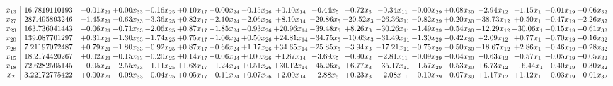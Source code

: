 \documentclass[9pt]{article}
\begin{document}
 \[\begin{array}{c| c c@{\hskip 2pt} c@{\hskip 2pt} c@{\hskip 2pt} c@{\hskip 2pt} c@{\hskip 2pt} c@{\hskip 2pt} c@{\hskip 2pt} c@{\hskip 2pt} c@{\hskip 2pt} c@{\hskip 2pt} c@{\hskip 2pt} c@{\hskip 2pt} c@{\hskip 2pt} c@{\hskip 2pt} c@{\hskip 2pt} c@{\hskip 2pt} }
 x_{13}   &  16.7819110193 & -0.01 x_{21} & +  0.00 x_{33} & -0.16 x_{25} & +  0.10 x_{17} & -0.00 x_{24} & -0.15 x_{26} & +  0.10 x_{14} & -0.44 x_{5} & -0.72 x_{3} & -0.34 x_{11} & -0.00 x_{29} & +  0.08 x_{30} & -2.94 x_{12} & -1.15 x_{1} & -0.01 x_{19} & +  0.06 x_{32}\\
 x_{27}   &  287.495893246 & -1.45 x_{21} & -0.63 x_{33} & -3.36 x_{25} & +  0.82 x_{17} & -2.10 x_{24} & -2.06 x_{26} & +  8.10 x_{14} & -29.86 x_{5} & -20.52 x_{3} & -26.36 x_{11} & -0.82 x_{29} & +  0.20 x_{30} & -38.73 x_{12} & +  0.50 x_{1} & -0.47 x_{19} & +  2.26 x_{32}\\
 x_{23}   &  163.736041443 & -0.06 x_{21} & -0.71 x_{33} & -2.06 x_{25} & +  0.87 x_{17} & -1.85 x_{24} & -0.93 x_{26} & + 20.96 x_{14} & -39.48 x_{5} & +  8.26 x_{3} & -30.26 x_{11} & -1.49 x_{29} & -0.54 x_{30} & -12.29 x_{12} & + 30.06 x_{1} & -0.15 x_{19} & +  0.61 x_{32}\\
 x_{20}   &  139.087701297 & +  0.31 x_{21} & -1.30 x_{33} & -1.74 x_{25} & +  0.75 x_{17} & -1.06 x_{24} & +  0.50 x_{26} & + 24.81 x_{14} & -34.75 x_{5} & -10.63 x_{3} & -31.49 x_{11} & -1.30 x_{29} & -0.42 x_{30} & +  2.09 x_{12} & +  0.77 x_{1} & -0.70 x_{19} & +  0.16 x_{32}\\
 x_{28}   &  7.21197072487 & +  0.79 x_{21} & -1.80 x_{33} & -0.92 x_{25} & +  0.87 x_{17} & -0.66 x_{24} & +  1.17 x_{26} & + 34.65 x_{14} & -25.85 x_{5} & -3.94 x_{3} & -17.21 x_{11} & -0.75 x_{29} & -0.50 x_{30} & + 18.67 x_{12} & +  2.86 x_{1} & -0.46 x_{19} & -0.28 x_{32}\\
 x_{15}   &  18.2174420267 & +  0.02 x_{21} & -0.15 x_{33} & -0.20 x_{25} & +  0.14 x_{17} & -0.06 x_{24} & +  0.00 x_{26} & +  1.87 x_{14} & -3.69 x_{5} & -0.90 x_{3} & -2.81 x_{11} & -0.09 x_{29} & -0.04 x_{30} & -0.63 x_{12} & -0.57 x_{1} & -0.05 x_{19} & +  0.05 x_{32}\\
 x_{18}   &  72.6282505145 & -0.05 x_{21} & -2.55 x_{33} & -1.11 x_{25} & +  1.68 x_{17} & -1.24 x_{24} & +  0.51 x_{26} & + 30.12 x_{14} & -45.26 x_{5} & +  6.77 x_{3} & -35.17 x_{11} & -1.57 x_{29} & -0.53 x_{30} & +  6.73 x_{12} & + 16.44 x_{1} & -0.40 x_{19} & +  0.30 x_{32}\\
 x_{2}   &  3.22172775422 & +  0.00 x_{21} & -0.09 x_{33} & -0.04 x_{25} & +  0.05 x_{17} & -0.11 x_{24} & +  0.07 x_{26} & +  2.00 x_{14} & -2.88 x_{5} & +  0.23 x_{3} & -2.08 x_{11} & -0.10 x_{29} & -0.07 x_{30} & +  1.17 x_{12} & +  1.12 x_{1} & -0.03 x_{19} & +  0.01 x_{32}\\

\end{array}\]
\end{document}
